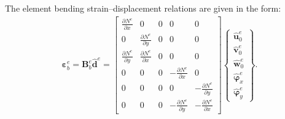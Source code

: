The element bending strain--displacement relations are given in the form:
\begin{eqnarray}
	\boldsymbol{\varepsilon}_b^e =
	\textbf{B}_b^e\widehat{\textbf{d}}^e = 
	\left [
	\begin{array}{ccccc}
		\frac{\partial N^e}{\partial x} & 0 & 0 & 0 & 0\\
		0 & \frac{\partial N^e}{\partial y} & 0 & 0 & 0\\
		\frac{\partial N^e}{\partial y} & \frac{\partial N^e}{\partial x} & 0 & 0 & 0\\
		0 & 0 & 0 & -\frac{\partial N^e}{\partial x} & 0\\
		0 & 0 & 0 & 0 & -\frac{\partial N^e}{\partial y}\\
		0 & 0 & 0 & -\frac{\partial N^e}{\partial y} & -\frac{\partial N^e}{\partial x}
	\end{array} \right]
	\left \{ \begin{array}{c}
		\widehat{\textbf{u}}_0^e \\
		\widehat{\textbf{v}}_0^e \\
		\widehat{\textbf{w}}_0^e \\
		\widehat{\boldsymbol{\varphi}}_x^e \\
		\widehat{\boldsymbol{\varphi}}_y^e
	\end{array} \right\}.
\end{eqnarray}

